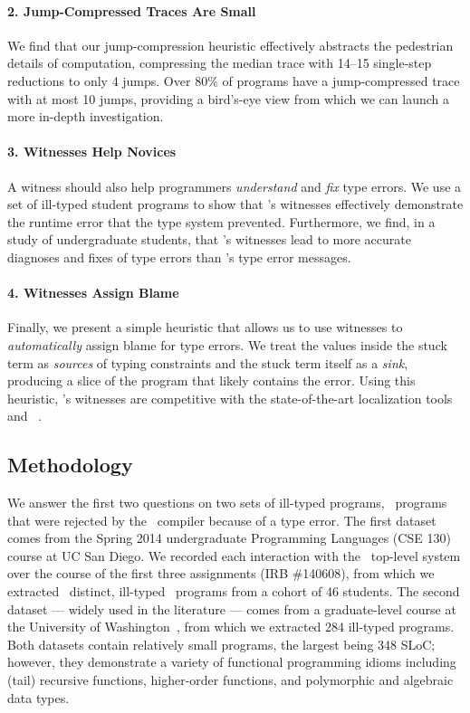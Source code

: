 \paragraph{2. Jump-Compressed Traces Are Small}
We find that our jump-compression heuristic effectively abstracts the
pedestrian details of computation, compressing the median trace with
14--15 single-step reductions to only 4 jumps.
%
Over 80\% of programs have a jump-compressed trace with at most 10
jumps, providing a bird's-eye view from which we can launch a more
in-depth investigation.

\paragraph{3. Witnesses Help Novices}
A witness should also help programmers \emph{understand} and
\emph{fix} type errors.
%
We use a set of ill-typed student programs to show that \toolname's
witnesses effectively demonstrate the runtime error that the type
system prevented.
%
Furthermore, we find, in a study of undergraduate students, that
\toolname's witnesses lead to more accurate diagnoses and fixes of type
errors than \ocaml's type error messages.

\paragraph{4. Witnesses Assign Blame}
Finally, we present a simple heuristic that allows us to use witnesses
to \emph{automatically} assign blame for type errors.
%
We treat the values inside the stuck term as \emph{sources} of typing
constraints and the stuck term itself as a \emph{sink}, producing
a slice of the program that likely contains the error.
%
Using this heuristic, \toolname's witnesses are competitive with the
state-of-the-art localization tools \mycroft~\cite{Loncaric2016-uk}
and \sherrloc~\cite{Zhang2014-lv}.

\subsection{Methodology}
\label{sec:methodology}
We answer the first two questions on two sets of ill-typed programs,
\ie\ programs that were rejected by the \ocaml\ compiler because of a
type error.
%
The first dataset comes from the Spring 2014 undergraduate Programming
Languages (CSE 130) course at UC San Diego.
%
We recorded each interaction with the \ocaml\ top-level system over the
course of the first three assignments (IRB
\#140608),
from which we extracted \ucsdsize\ distinct, ill-typed \ocaml\ programs
from a cohort of 46 students.
%
The second dataset --- widely used in the literature --- comes from a
graduate-level course at the University of Washington~\cite{Lerner2006-pj},
from which we extracted 284 ill-typed programs.
%
Both datasets contain relatively small programs, the largest being 348
SLoC; however, they demonstrate a variety of functional programming
idioms including (tail) recursive functions, higher-order functions,
and polymorphic and algebraic data types. %

